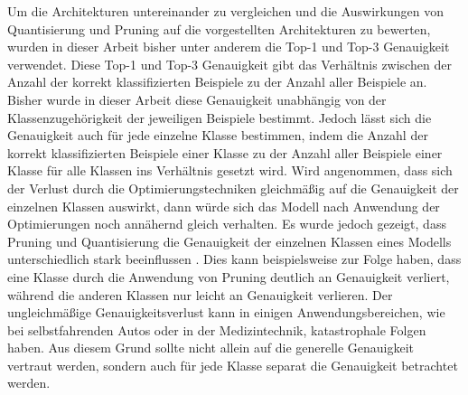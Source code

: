 Um die Architekturen untereinander zu vergleichen und die Auswirkungen von Quantisierung und Pruning auf die vorgestellten Architekturen zu bewerten, wurden in dieser Arbeit bisher unter anderem die Top-1 und Top-3 Genauigkeit verwendet. Diese Top-1 und Top-3 Genauigkeit gibt das Verhältnis zwischen der Anzahl der korrekt klassifizierten Beispiele zu der Anzahl aller Beispiele an. Bisher wurde in dieser Arbeit diese Genauigkeit unabhängig von der Klassenzugehörigkeit der jeweiligen Beispiele bestimmt. Jedoch lässt sich die Genauigkeit auch für jede einzelne Klasse bestimmen, indem die Anzahl der korrekt klassifizierten Beispiele einer Klasse zu der Anzahl aller Beispiele einer Klasse für alle Klassen ins Verhältnis gesetzt wird. Wird angenommen, dass sich der Verlust durch die Optimierungstechniken gleichmäßig auf die Genauigkeit der einzelnen Klassen auswirkt, dann würde sich das Modell nach Anwendung der Optimierungen noch annähernd gleich verhalten. Es wurde jedoch gezeigt, dass Pruning und Quantisierung die Genauigkeit der einzelnen Klassen eines Modells unterschiedlich stark beeinflussen \cite{hooker_what_2020}. Dies kann beispielsweise zur Folge haben, dass eine Klasse durch die Anwendung von Pruning deutlich an Genauigkeit verliert, während die anderen Klassen nur leicht an Genauigkeit verlieren. Der ungleichmäßige Genauigkeitsverlust kann in einigen Anwendungsbereichen, wie bei selbstfahrenden Autos oder in der Medizintechnik, katastrophale Folgen haben. Aus diesem Grund sollte nicht allein auf die generelle Genauigkeit vertraut werden, sondern auch für jede Klasse separat die Genauigkeit betrachtet werden. 

